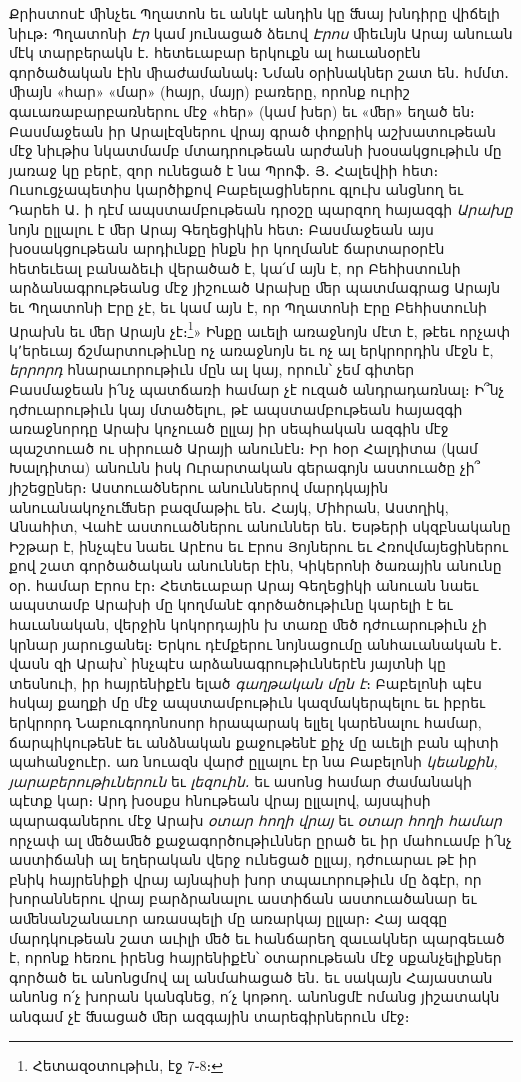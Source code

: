 \documentclass{article}
\begin{document}
{Քրիստոսէ ﬕնչեւ Պղատոն եւ անկէ անդին կը ﬓայ խնդիրը վիճելի նիւթ։ Պղատոնի \emph{Էր} կամ յունացած ձեւով \emph{Էրոս} ﬕեւնյն Արայ անուան մէկ տարբերակն է․ հետեւաբար երկուքն ալ հաւանօրէն գործածական էին ﬕաժամանակ։ Նման օրինակներ շատ են․ հմմտ․ ﬕայն «հար» «մար» (հայր, մայր) բառերը, որոնք ուրիշ գաւառաբարբառներու մէջ «հեր» (կամ խեր) եւ «ﬔր» եղած են։ Բասմաջեան իր Արալէզներու վրայ գրած փոքրիկ աշխատութեան մէջ նիւթիս նկատմամբ մտադրութեան արժանի խօսակցութիւն մը յառաջ կը բերէ, զոր ունեցած է նա Պրոֆ․ Յ․ Հալեվիի հետ։ Ուսուցչապետիս կարծիքով Բաբելացիներու գլուխ անցնող եւ Դարեհ Ա․ ի դէմ ապստամբութեան դրօշը պարզող հայազգի \emph{Արախը} նոյն ըլլալու է ﬔր Արայ Գեղեցիկին հետ։ Բասմաջեան այս խօսակցութեան արդիւնքը ինքն իր կողմանէ ճարտարօրէն հետեւեալ բանաձեւի վերածած է, կա՛մ այն է, որ Բեհիստունի արձանագրութեանց մէջ յիշուած Արախը ﬔր պատմագրաց Արայն եւ Պղատոնի Էրը չէ, եւ կամ այն է, որ Պղատոնի Էրը Բեհիստունի Արախն եւ ﬔր Արայն չէ։\footnote{Հետազօտութիւն, էջ 7֊8։ }» Ինքը աւելի առաջնոյն մէտ է, թէեւ որչափ կ՚երեւայ ճշմարտութիւնը ոչ առաջնոյն եւ ոչ ալ երկրորդին մէջն է, \emph{երրորդ} հնարաւորութիւն մըն ալ կայ, որուն՝ չեմ գիտեր Բասմաջեան ի՛նչ պատճառի համար չէ ուզած անդրադառնալ։ Ի՞նչ դժուարութիւն կայ մտածելու, թէ ապստամբութեան հայազգի առաջնորդը Արախ կոչուած ըլլայ իր սեպհական ազգին մէջ պաշտուած ու սիրուած Արայի անունէն։ Իր հօր Հալդիտա (կամ Խալդիտա) անունն իսկ Ուրարտական գերագոյն աստուածը չի՞ յիշեցըներ։ Աստուածներու անուններով մարդկային անուանակոչուﬓեր բազմաթիւ են․ Հայկ, Միհրան, Աստղիկ, Անահիտ, Վահէ աստուածներու անուններ են․ Եսթերի սկզբնականը Իշթար է, ինչպէս նաեւ Արէոս եւ Էրոս Յոյներու եւ Հռովմայեցիներու քով շատ գործածական անուններ էին, Կիկերոնի ծառային անունը օր․ համար Էրոս էր։ Հետեւաբար Արայ Գեղեցիկի անուան նաեւ ապստամբ Արախի մը կողմանէ գործածութիւնը կարելի է եւ հաւանական, վերջին կոկորդային խ տառը ﬔծ դժուարութիւն չի կրնար յարուցանել։ Երկու դէմքերու նոյնացումը անհաւանական է․ վասն զի Արախ՝ ինչպէս արձանագրութիւններէն յայտնի կը տեսնուի, իր հայրենիքէն ելած \emph{գաղթական մըն է}։ Բաբելոնի պէս հսկայ քաղքի մը մէջ ապստամբութիւն կազմակերպելու եւ իբրեւ երկրորդ Նաբուգոդոնոսոր հրապարակ ելլել կարենալու համար, ճարպիկութենէ եւ անձնական քաջութենէ քիչ մը աւելի բան պիտի պահանջուէր․ առ նուազն վարժ ըլլալու էր նա Բաբելոնի \emph{կեանքին, յարաբերութիւներուն} եւ \emph{լեզուին․} եւ ասոնց համար ժամանակի պէտք կար։ Արդ խօսքս հնութեան վրայ ըլլալով, այսպիսի պարագաներու մէջ Արախ \emph{օտար հողի վրայ} եւ \emph{օտար հողի համար} որչափ ալ ﬔծաﬔծ քաջագործութիւններ ըրած եւ իր մահուամբ ի՛նչ աստիճանի ալ եղերական վերջ ունեցած ըլլայ, դժուարաւ թէ իր բնիկ հայրենիքի վրայ այնպիսի խոր տպաւորութիւն մը ձգէր, որ խորաններու վրայ բարձրանալու աստիճան աստուածանար եւ աﬔնանշանաւոր առասպելի մը առարկայ ըլլար։ Հայ ազգը մարդկութեան շատ աւիլի ﬔծ եւ հանճարեղ զաւակներ պարգեւած է, որոնք հեռու իրենց հայրենիքէն՝ օտարութեան մէջ սքանչելիքներ գործած եւ անոնցմով ալ անմահացած են․ եւ սակայն Հայաստան անոնց ո՛չ խորան կանգնեց, ո՛չ կոթող․ անոնցմէ ոմանց յիշատակն անգամ չէ ﬓացած ﬔր ազգային տարեգիրներուն մէջ։

}
\end{document}
